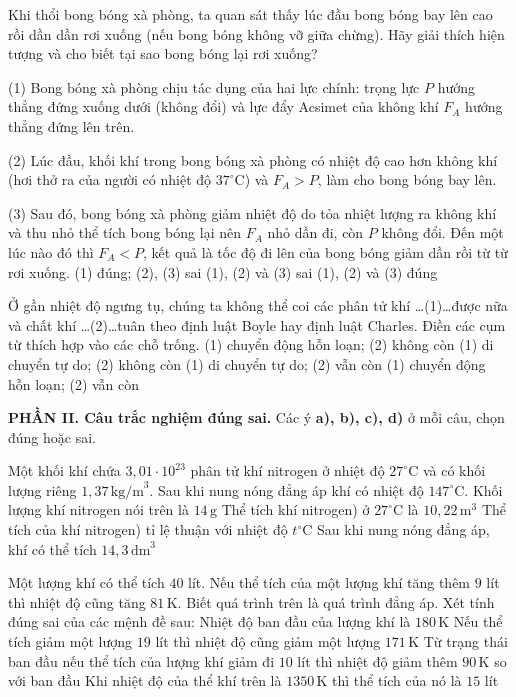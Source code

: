 \documentclass[12pt,a4paper,oneside]{article}
\begin{document}
\begin{ex}
	Khi thổi bong bóng xà phòng, ta quan sát thấy lúc đầu bong bóng bay lên cao rồi dần dần rơi xuống (nếu bong bóng không vỡ giữa chừng). Hãy giải thích hiện tượng và cho biết tại sao bong bóng lại rơi xuống?
	
	(1) Bong bóng xà phòng chịu tác dụng của hai lực chính: trọng lực $P$ hướng thẳng đứng xuống dưới (không đổi) và lực đẩy Acsimet của không khí $F_A$ hướng thẳng đứng lên trên.
	
	(2) Lúc đầu, khối khí trong bong bóng xà phòng có nhiệt độ cao hơn không khí (hơi thở ra của người có nhiệt độ $37^{\circ}\text{C}$) và $F_A > P$, làm cho bong bóng bay lên.
	
	(3) Sau đó, bong bóng xà phòng giảm nhiệt độ do tỏa nhiệt lượng ra không khí và thu nhỏ thể tích bong bóng lại nên $F_A$ nhỏ dần đi, còn $P$ không đổi. Đến một lúc nào đó thì $F_A < P$, kết quả là tốc độ đi lên của bong bóng giảm dần rồi từ từ rơi xuống.
	{(1) đúng; (2), (3) sai}
	{(1), (2) và (3) sai}
	{(1), (2) và (3) đúng}
\end{ex}

\begin{ex}
	Ở gần nhiệt độ ngưng tụ, chúng ta không thể coi các phân tử khí \dots(1)\dots được nữa và chất khí \dots(2)\dots tuân theo định luật Boyle hay định luật Charles. Điền các cụm từ thích hợp vào các chỗ trống.
	\choice
	{(1) chuyển động hỗn loạn; (2) không còn}
	{(1) di chuyển tự do; (2) không còn}
	{(1) di chuyển tự do; (2) vẫn còn}
	{(1) chuyển động hỗn loạn; (2) vẫn còn}
\end{ex}

\noindent\textbf{PHẦN II. Câu trắc nghiệm đúng sai.} Các ý \textbf{a), b), c), d)} ở mỗi câu, chọn đúng hoặc sai.

\begin{ex}
	Một khối khí chứa $3{,}01 \cdot 10^{23}$ phân tử khí nitrogen ở nhiệt độ $27^{\circ}\text{C}$ và có khối lượng riêng $1{,}37\,\text{kg/m}^3$. Sau khi nung nóng đẳng áp khí có nhiệt độ $147^{\circ}\text{C}$.
	\choiceTF
	{Khối lượng khí nitrogen nói trên là $14\,\text{g}$}
	{Thể tích khí nitrogen) ở $27^{\circ}\text{C}$ là $10{,}22\,\text{m}^3$}
	{Thể tích của khí nitrogen) tỉ lệ thuận với nhiệt độ $t^{\circ}\text{C}$}
	{Sau khi nung nóng đẳng áp, khí có thể tích $14{,}3\,\text{dm}^3$}
\end{ex}

\begin{ex}
	Một lượng khí có thể tích $40$ lít. Nếu thể tích của một lượng khí tăng thêm $9$ lít thì nhiệt độ cũng tăng $81\,\text{K}$. Biết quá trình trên là quá trình đẳng áp. Xét tính đúng sai của các mệnh đề sau:
	\choiceTF
	{Nhiệt độ ban đầu của lượng khí là $180\,\text{K}$}
	{Nếu thể tích giảm một lượng $19$ lít thì nhiệt độ cũng giảm một lượng $171\,\text{K}$}
	{Từ trạng thái ban đầu nếu thể tích của lượng khí giảm đi $10$ lít thì nhiệt độ giảm thêm $90\,\text{K}$ so với ban đầu}
	{Khi nhiệt độ của thể khí trên là $1350\,\text{K}$ thì thể tích của nó là $15$ lít}
\end{ex}
\end{document}
